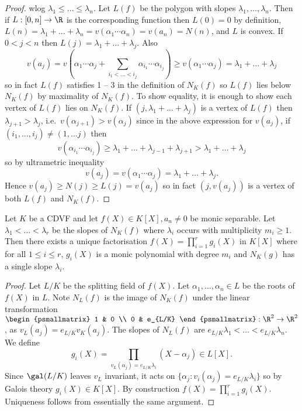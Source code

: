 \documentclass[a4paper]{article}
\begin{document}
\begin{proof}
  wlog \(\lambda_1 \leq \dots \leq \lambda_n\). Let \(L(f)\) be the polygon with slopes \(\lambda_1, \dots, \lambda_n\). Then if \(L: [0, n] \to \R\) is the corresponding function then \(L(0) = 0\) by definition, \(L(n) = \lambda_1 + \dots + \lambda_n = v(\alpha_1 \cdots \alpha_n) = v(a_n) = N(n)\), and \(L\) is convex. If \(0 < j < n\) then \(L(j) = \lambda_1 + \dots + \lambda_j\). Also
  \[
    v(a_j) = v(\alpha_1 \cdots \alpha_j + \sum_{i_1 < \dots < i_j} \alpha_{i_1} \cdots \alpha_{i_j}) \geq v(\alpha_1 \cdots \alpha_j) = \lambda_1 + \dots + \lambda_j
  \]
  so in fact \(L(f)\) satisfies 1 -- 3 in the definition of \(N_K(f)\) so \(L(f)\) lies below \(N_K(f)\) by maximality of \(N_K(f)\). To show equality, it is enough to show each vertex of \(L(f)\) lies on \(N_K(f)\). If \((j, \lambda_1 + \dots + \lambda_j)\) is a vertex of \(L(f)\) then \(\lambda_{j + 1} > \lambda_j\), i.e.\ \(v(\alpha_{j + 1}) > v(\alpha_j)\) since in the above expression for \(v(a_j)\), if \((i_1, \dots, i_j) \neq (1, \dots j)\) then
  \[
    v(\alpha_{i_1} \cdots \alpha_{i_j}) \geq \lambda_1 + \dots + \lambda_{j - 1} + \lambda_{j + 1} > \lambda_1 + \dots + \lambda_j
  \]
  so by ultrametric inequality
  \[
    v(a_j) = v(\alpha_1 \cdots \alpha_j) = \lambda_1 + \dots + \lambda_j.
  \]
  Hence \(v(a_j) \geq N(j) \geq L(j) = v(a_j)\) so in fact \((j, v(a_j))\) is a vertex of both \(L(f)\) and \(N_K(f)\).
\end{proof}

\begin{proposition}
  Let \(K\) be a CDVF and let \(f(X) \in K[X], a_n \neq 0\) be monic separable. Let \(\lambda_1 < \dots < \lambda_r\) be the slopes of \(N_K(f)\) where \(\lambda_i\) occurs with multiplicity \(m_i \geq 1\). Then there exists a unique factorisation \(f(X) = \prod_{i = 1}^r g_i(X)\) in \(K[X]\) where for all \(1 \leq i \leq r\), \(g_i(X)\) is a monic polynomial with degree \(m_i\) and \(N_K(g)\) has a single slope \(\lambda_i\).
\end{proposition}

\begin{proof}
  Let \(L/K\) be the splitting field of \(f(X)\). Let \(\alpha_1, \dots, \alpha_n \in L\) be the roots of \(f(X)\) in \(L\). Note \(N_L(f)\) is the image of \(N_K(f)\) under the linear transformation \(
  \begin{psmallmatrix}
    1 & 0 \\
    0 & e_{L/K}
  \end{psmallmatrix}
  :\R^2 \to \R^2\), as \(v_L(a_j) = e_{L/K} v_K(a_j)\). The slopes of \(N_L(f)\) are \(e_{L/K} \lambda_1 < \dots < e_{L/K} \lambda_n\). We define
  \[
    g_i(X) = \prod_{v_L(\alpha_j) = e_{L/K} \lambda_i} (X - \alpha_j) \in L[X].
  \]
  Since \(\gal(L/K)\) leaves \(v_L\) invariant, it acts on \(\{\alpha_j: v_i(\alpha_j) = e_{L/K} \lambda_i\}\) so by Galois theory \(g_i(X) \in K[X]\). By construction \(f(X) = \prod_{i = 1}^r g_i(X)\). Uniqueness follows from essentially the same argument.
\end{proof}
\end{document}
